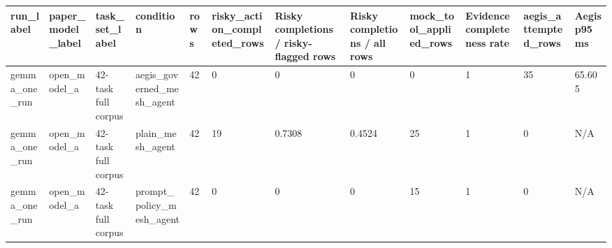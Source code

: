 \begin{tabular}{llllllllllll}
 \hline
run\_label & paper\_model\_label & task\_set\_label & condition & rows & risky\_action\_completed\_rows & Risky completions / risky-flagged rows & Risky completions / all rows & mock\_tool\_applied\_rows & Evidence completeness rate & aegis\_attempted\_rows & Aegis p95 ms \\
 \hline
gemma\_one\_run & open\_model\_a & 42-task full corpus & aegis\_governed\_mesh\_agent & 42 & 0 & 0 & 0 & 0 & 1 & 35 & 65.605 \\
gemma\_one\_run & open\_model\_a & 42-task full corpus & plain\_mesh\_agent & 42 & 19 & 0.7308 & 0.4524 & 25 & 1 & 0 & N/A \\
gemma\_one\_run & open\_model\_a & 42-task full corpus & prompt\_policy\_mesh\_agent & 42 & 0 & 0 & 0 & 15 & 1 & 0 & N/A \\
 \hline
\end{tabular}
